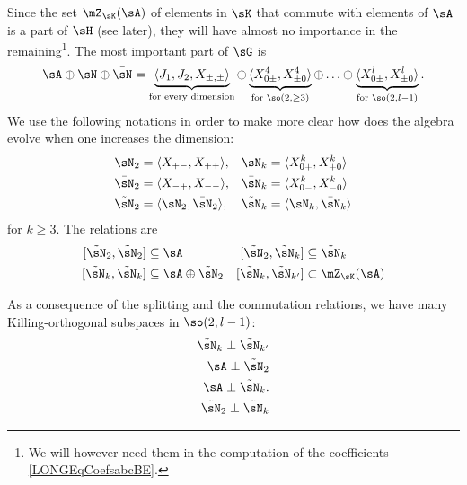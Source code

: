 Since the set $\mZ_{\sK}(\sA)$ of elements in $\sK$ that commute with elements of $\sA$ is a part of $\sH$ (see later), they will have almost no importance in the remaining\footnote{We will however need them in the computation of the coefficients \eqref{LONGEqCoefsabcBE}.}. The most important part of $\sG$ is
\begin{equation}		\label{LONGEqDecomDimQlipm}
	\sA\oplus\sN\oplus\bar\sN=\underbrace{\langle J_1,J_2,X_{\pm,\pm}\rangle}_{\text{for every dimension}}\oplus\underbrace{\langle X_{0\pm}^{4},X_{\pm 0}^{4}\rangle}_{\text{for }\so(2,\geq 3)}\oplus\ldots\oplus\underbrace{\langle X_{0\pm}^l,X_{\pm 0}^{l}\rangle}_{\text{for } \so(2, l-1)}.
\end{equation}
We use the following notations in order to make more clear how does the algebra evolve when one increases the dimension:
\begin{equation}
	\begin{aligned}[]
		\sN_2       & =\langle X_{+-},X_{++}\rangle,   & \sN_k       & =\langle X^k_{0+},X_{+0}^k\rangle \\
		\bar\sN_2   & =\langle X_{-+},X_{--} \rangle,  & \bar\sN_k   & =\langle X_{0-}^k,X_{-0}^k\rangle \\
		\tilde\sN_2 & =\langle \sN_2,\bar\sN_2\rangle, & \tilde\sN_k & =\langle \sN_k,\bar\sN_k\rangle
	\end{aligned}
\end{equation}
for $k\geq 3$. The relations are
\begin{equation}		\label{LONGEqsCommWithtsNDeuxkA}
	\begin{aligned}[]
		[\tilde\sN_2,\tilde\sN_2]   & \subseteq\sA
		                            & [\tilde\sN_2,\tilde\sN_k]     & \subseteq\tilde\sN_k   \\
		[\tilde\sN_k,\tilde\sN_{k}] & \subseteq\sA\oplus\tilde\sN_2
		                            & [\tilde\sN_k,\tilde\sN_{k'}]  & \subset \mZ_{\sK}(\sA) \\
	\end{aligned}
\end{equation}

As a consequence of the splitting and the commutation relations, we have many Killing-orthogonal subspaces in $\so(2,l-1)$:
\begin{subequations}
	\begin{align}
		\tilde\sN_k\perp\tilde\sN_{k'}		\label{LONGEqtsnkperprtsnkp} \\
		\sA\perp\tilde\sN_2			\label{LONGEqAperpNTrois}              \\
		\sA\perp\tilde\sN_k.	\label{LONGEqAperpNk}                   \\
		\tilde\sN_2\perp\tilde\sN_k	\label{LONGEqNTtroisperpNk}
	\end{align}
\end{subequations}


